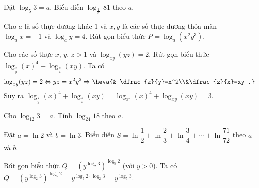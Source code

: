 \begin{bt}
	Đặt $\log _5 3=a$. Biểu diễn $\log _{\tfrac{1}{25}} 81$ theo $a$.
\end{bt}
\begin{bt}
	Cho $a$ là số thực dương khác $1$ và $x,y$ là các số thực dương thỏa mãn ${{\log }_a}x=-1$ và ${{\log }_a}y=4$. Rút gọn biểu thức $P={{\log }_a}( {x^2}{y^3} )$.
\end{bt}
\begin{bt}
	Cho các số thực $ x,\, y ,\, z >1$ và $ \log_{xy}(yz)=2 $. Rút gọn biểu thức $\log_{\frac{z}{y}}\left(x\right)^4 +\log_{\frac{z}{x}}(xy)$.
	\loigiai
	{
		Ta có \[ \log_{xy}(yz)=2\Leftrightarrow yz=x^2y^2\Rightarrow \heva{& \dfrac{z}{y}=x^2\\&\dfrac{z}{x}=xy .}\]
		Suy ra $ \log_{\frac{z}{y}}\left(x\right) ^4 +\log_{\frac{z}{x}}(xy)=\log_{x^2} (x)^4+\log_{xy}(xy)=3$.
	}
\end{bt}
\begin{bt}
	Cho $\log_{12}3=a$. Tính $\log_{24}18$ theo $a$.
\end{bt}
\begin{bt}
	Đặt $a=\ln2$ và $b=\ln 3$. Biểu diễn $S=\ln\dfrac{1}{2}+\ln\dfrac{2}{3}+\ln\dfrac{3}{4}+\cdots+\ln\dfrac{71}{72}$ theo $a$ và $b$.
\end{bt}
\begin{bt}
	Rút gọn biểu thức $Q=\left(y^{\log_2 3}\right)^{\log_5 2}$ (với $y>0$).
	\loigiai
	{
		Ta có $Q=\left(y^{\log_2 3}\right)^{\log_5 2}=y^{\log_5 2\cdot\log_2 3}=y^{\log_5 3}$.
	}
\end{bt}
